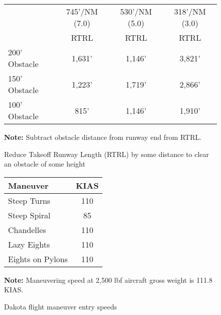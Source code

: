 \documentclass{article}
\begin{document}
\lsstyle

\raggedcolumns

\begin{figure}[ht]
    \centering

    \begin{tabular}{lccc}
        \toprule
                      & \multicolumn{1}{c}{745'/NM (7.0\textdegree{})} & \multicolumn{1}{c}{530'/NM (5.0\textdegree{})} & \multicolumn{1}{c}{318'/NM (3.0\textdegree{})}
        \\\cmidrule(lr){2-2}\cmidrule(lr){3-3}\cmidrule(lr){4-4}
                      & RTRL                                           & RTRL                                           & RTRL                                           \\\midrule
        200' Obstacle & 1,631'                                         & 1,146'                                         & 3,821'                                         \\
        150' Obstacle & 1,223'                                         & 1,719'                                         & 2,866'                                         \\
        100' Obstacle & 815'                                           & 1,146'                                         & 1,910'                                         \\
    \end{tabular}

    \hfill

    \textbf{Note:} Subtract obstacle distance from runway end from RTRL.

    \caption{Reduce Takeoff Runway Length (RTRL) by some distance to clear an obstacle of some height}
\end{figure}

\begin{figure}[ht]
    \centering

    \begin{tabular}{lc}
        \toprule
        Maneuver         & KIAS \\
        \midrule
        Steep Turns      & 110  \\
        Steep Spiral     & 85   \\
        Chandelles       & 110  \\
        Lazy Eights      & 110  \\
        Eights on Pylons & 110  \\
    \end{tabular}

    \hfill

    \textbf{Note:} Maneuvering speed at 2,500 lbf aircraft gross weight is 111.8 KIAS.

    \caption{Dakota flight maneuver entry speeds}
\end{figure}
\end{document}
